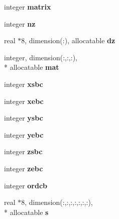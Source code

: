 \begin{DoxyCompactItemize}
\item 
\hypertarget{classinvar_ad66c1deb91ee7d0e72856b25cb0bf6d4}{integer {\bfseries matrix}}\label{classinvar_ad66c1deb91ee7d0e72856b25cb0bf6d4}

\item 
\hypertarget{classinvar_adb3bfc085dfbbc76e236bf7709c98a29}{integer {\bfseries nz}}\label{classinvar_adb3bfc085dfbbc76e236bf7709c98a29}

\item 
\hypertarget{classinvar_a2e800e5321428f5226b62f5e952e9095}{real $\ast$8, dimension(\-:), allocatable {\bfseries dz}}\label{classinvar_a2e800e5321428f5226b62f5e952e9095}

\item 
\hypertarget{classinvar_a2a47bbd7a8e09bd67ee8d9df4dfc5d4c}{integer, dimension(\-:,\-:,\-:), \\*
allocatable {\bfseries mat}}\label{classinvar_a2a47bbd7a8e09bd67ee8d9df4dfc5d4c}

\item 
\hypertarget{classinvar_ac43b19b4e4bcff61f0e4f9524189c8ba}{integer {\bfseries xsbc}}\label{classinvar_ac43b19b4e4bcff61f0e4f9524189c8ba}

\item 
\hypertarget{classinvar_afdac254b51a0c1e15bcdcd5ec78ab097}{integer {\bfseries xebc}}\label{classinvar_afdac254b51a0c1e15bcdcd5ec78ab097}

\item 
\hypertarget{classinvar_a9feb27241762c9dd706e558252f092e9}{integer {\bfseries ysbc}}\label{classinvar_a9feb27241762c9dd706e558252f092e9}

\item 
\hypertarget{classinvar_a9012ac72ddd4547ce6b4b0c28701049e}{integer {\bfseries yebc}}\label{classinvar_a9012ac72ddd4547ce6b4b0c28701049e}

\item 
\hypertarget{classinvar_ab045f0221783a9b1b14a3169a13b652e}{integer {\bfseries zsbc}}\label{classinvar_ab045f0221783a9b1b14a3169a13b652e}

\item 
\hypertarget{classinvar_a6d0cbede1297cdf187502fad15cde4ea}{integer {\bfseries zebc}}\label{classinvar_a6d0cbede1297cdf187502fad15cde4ea}

\item 
\hypertarget{classinvar_ada256e2673f0bae0b39e1bed05a0691a}{integer {\bfseries ordcb}}\label{classinvar_ada256e2673f0bae0b39e1bed05a0691a}

\item 
\hypertarget{classinvar_a319dd4f77663bb45329b5f76da96cd7e}{real $\ast$8, dimension(\-:,\-:,\-:,\-:,\-:,\-:,\-:), \\*
allocatable {\bfseries s}}\label{classinvar_a319dd4f77663bb45329b5f76da96cd7e}


\end{DoxyCompactItemize}
